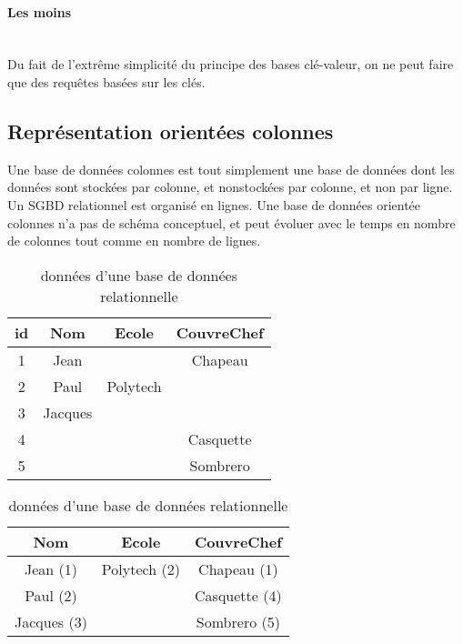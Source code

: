 \documentclass[a4paper,11pt]{article}
\begin{document}
		\paragraph{Les moins}~\\

		Du fait de l’extrême simplicité du principe des bases clé-valeur, on ne peut faire que des requêtes basées sur les clés.
		
		\subsection{Représentation orientées colonnes}
		Une base de données colonnes est tout simplement une base de données dont les données sont stockées par colonne, et nonstockées par colonne, et non par ligne. Un SGBD relationnel est organisé en lignes. Une base de données orientée colonnes n’a pas de schéma conceptuel, et peut évoluer avec le temps en nombre de colonnes tout comme en nombre de lignes.\\
		\begin{table}[h]
			\begin{center}
				\begin{tabular}{|c|c|c|c|}
				\hline 
				\textbf{id} & \textbf{Nom} & \textbf{Ecole} & \textbf{CouvreChef} \\ 
				\hline 
				\hline
				1 & Jean & & Chapeau \\ 
				\hline 
				2 & Paul & Polytech & \\ 
				\hline 
				3 & Jacques & &  \\ 
				\hline 
				4 & & & Casquette \\ 
				\hline 
				5 & & & Sombrero \\ 
				\hline	
				\end{tabular}
			\end{center}
			\caption{données d’une base de données relationnelle}
		\end{table}
	
		\begin{table}[h]
			\begin{center}
				\begin{tabular}{|c|c|c|}
				\hline 
				\textbf{Nom} & \textbf{Ecole} & \textbf{CouvreChef} \\ 
				\hline 
				\hline
				Jean (1) & Polytech (2) & Chapeau (1) \\ 
				\hline 
				Paul (2) &  & Casquette (4)\\ 
				\hline 
				Jacques (3) &  & Sombrero (5) \\ 
				\hline 	
				\end{tabular}
			\end{center}
			\caption{données d’une base de données relationnelle}
		\end{table}
	~
\end{document}
